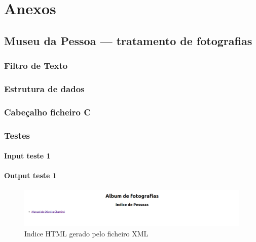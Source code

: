 \chapter{Anexos}
\label{cap:anex}


\section{Museu da Pessoa — tratamento de fotografias}
\label{seq:anex-museu}

\subsection{Filtro de Texto}
\label{seq:anex-museu-filtro}


\subsection{Estrutura de dados}
\label{seq:anex-museu-est}


\subsection{Cabeçalho ficheiro C}
\label{seq:anex-museu-header}


\subsection{Testes}
\label{seq:anex-museu-test}
\subsubsection{Input teste 1}
\label{seq:anex-museu-test-in01}


\subsubsection{Output teste 1}
\label{seq:anex-museu-test-out01-01}


\begin{figure}[H]
\centering
\includegraphics[width=15cm]{anexos/2-1/Exemplo1/Screenshots/indice.png}
\caption{Indice HTML gerado pelo ficheiro XML}
\end{figure}


